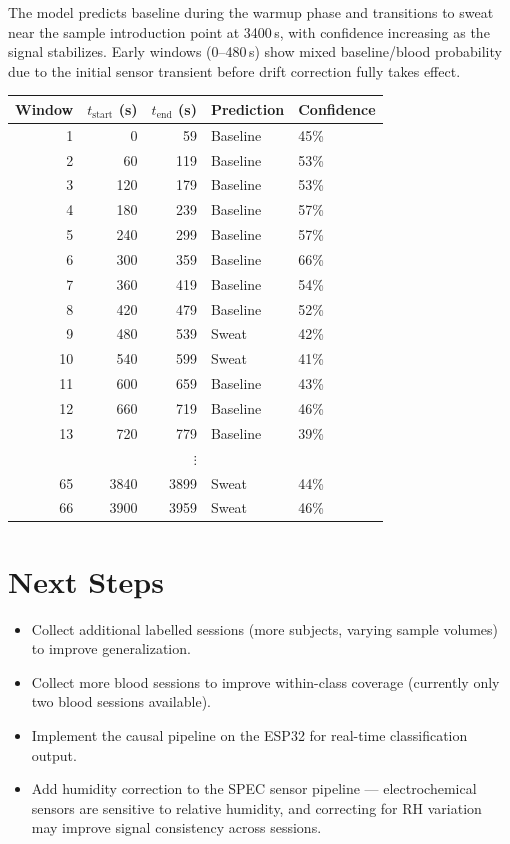 \documentclass[11pt,a4paper]{article}
\begin{document}
The model predicts baseline during the warmup phase and transitions to sweat near the
sample introduction point at 3400\,s, with confidence increasing as the signal stabilizes.
Early windows (0--480\,s) show mixed baseline/blood probability due to the initial
sensor transient before drift correction fully takes effect.

\begin{center}
\small
\begin{tabular}{rrrll}
\toprule
Window & $t_{\text{start}}$ (s) & $t_{\text{end}}$ (s) & Prediction & Confidence \\
\midrule
 1 &    0 &   59 & Baseline &  45\% \\
 2 &   60 &  119 & Baseline &  53\% \\
 3 &  120 &  179 & Baseline &  53\% \\
 4 &  180 &  239 & Baseline &  57\% \\
 5 &  240 &  299 & Baseline &  57\% \\
 6 &  300 &  359 & Baseline &  66\% \\
 7 &  360 &  419 & Baseline &  54\% \\
 8 &  420 &  479 & Baseline &  52\% \\
 9 &  480 &  539 & Sweat    &  42\% \\
10 &  540 &  599 & Sweat    &  41\% \\
11 &  600 &  659 & Baseline &  43\% \\
12 &  660 &  719 & Baseline &  46\% \\
13 &  720 &  779 & Baseline &  39\% \\
\multicolumn{5}{c}{$\vdots$} \\
65 & 3840 & 3899 & Sweat    &  44\% \\
66 & 3900 & 3959 & Sweat    &  46\% \\
\bottomrule
\end{tabular}
\end{center}

\section{Next Steps}

\begin{itemize}
  \item Collect additional labelled sessions (more subjects, varying
        sample volumes) to improve generalization.
  \item Collect more blood sessions to improve within-class coverage
        (currently only two blood sessions available).
  \item Implement the causal pipeline on the ESP32 for real-time
        classification output.
  \item Add humidity correction to the SPEC sensor pipeline --- electrochemical
        sensors are sensitive to relative humidity, and correcting for RH
        variation may improve signal consistency across sessions.
\end{itemize}
\end{document}

